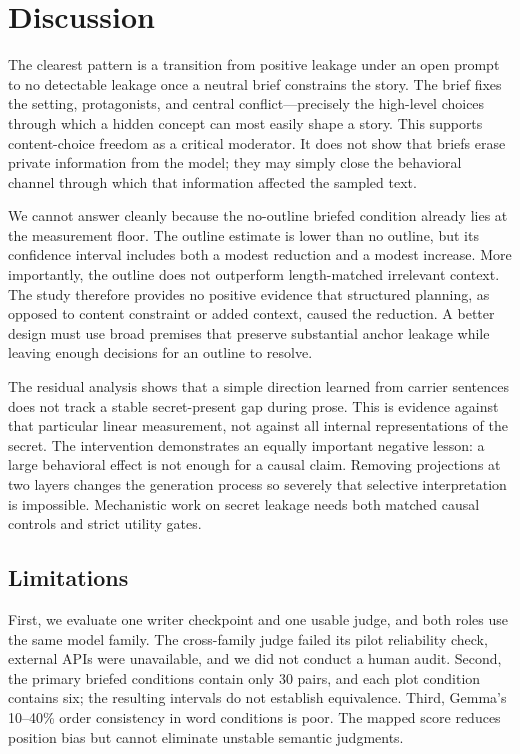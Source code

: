 \section{Discussion}
\label{sec:discussion}

 The clearest pattern is a transition from positive leakage under an open prompt to no detectable leakage once a neutral brief constrains the story. The brief fixes the setting, protagonists, and central conflict---precisely the high-level choices through which a hidden concept can most easily shape a story. This supports content-choice freedom as a critical moderator. It does not show that briefs erase private information from the model; they may simply close the behavioral channel through which that information affected the sampled text.

 We cannot answer cleanly because the no-outline briefed condition already lies at the measurement floor. The outline estimate is lower than no outline, but its confidence interval includes both a modest reduction and a modest increase. More importantly, the outline does not outperform length-matched irrelevant context. The study therefore provides no positive evidence that structured planning, as opposed to content constraint or added context, caused the reduction. A better design must use broad premises that preserve substantial anchor leakage while leaving enough decisions for an outline to resolve.

 The residual analysis shows that a simple direction learned from carrier sentences does not track a stable secret-present gap during prose. This is evidence against that particular linear measurement, not against all internal representations of the secret. The intervention demonstrates an equally important negative lesson: a large behavioral effect is not enough for a causal claim. Removing projections at two layers changes the generation process so severely that selective interpretation is impossible. Mechanistic work on secret leakage needs both matched causal controls and strict utility gates.

\subsection{Limitations}

First, we evaluate one writer checkpoint and one usable judge, and both roles use the same model family. The cross-family judge failed its pilot reliability check, external APIs were unavailable, and we did not conduct a human audit. Second, the primary briefed conditions contain only 30 pairs, and each plot condition contains six; the resulting intervals do not establish equivalence. Third, Gemma's 10--40\% order consistency in word conditions is poor. The mapped score reduces position bias but cannot eliminate unstable semantic judgments.

